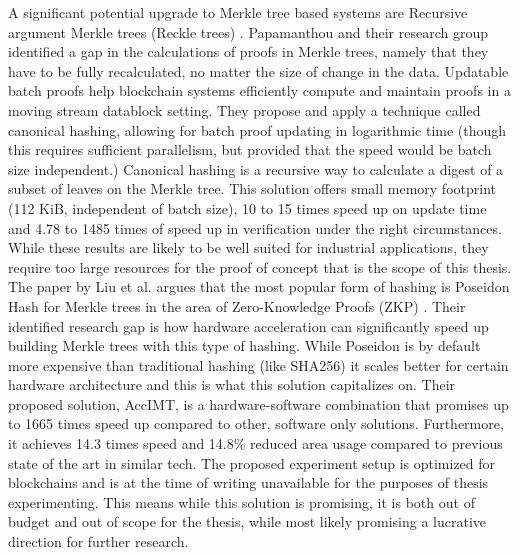 \documentclass[english, 12pt, a4paper, sci, utf8, a-2b, online]{aaltothesis}
\theoremstyle{change}
\theoremstyle{theoremstyle}
\begin{document}
A significant potential upgrade to Merkle tree based systems are Recursive argument Merkle trees (Reckle trees) \cite{papamanthou2024reckle}. Papamanthou and their research group identified a gap in the calculations of proofs in Merkle trees, namely that they have to be fully recalculated, no matter the size of change in the data. Updatable batch proofs help blockchain systems efficiently compute and maintain proofs in a moving stream datablock setting. They propose and apply a technique called canonical hashing, allowing for batch proof updating in logarithmic time (though this requires sufficient parallelism, but provided that the speed would be batch size independent.) Canonical hashing is a recursive way to calculate a digest of a subset of leaves on the Merkle tree. This solution offers small memory footprint (112 KiB, independent of batch size), 10 to 15 times speed up on update time and 4.78 to 1485 times of speed up in verification under the right circumstances. While these results are likely to be well suited for industrial applications, they require too large resources for the proof of concept that is the scope of this thesis.\\
The paper by Liu et al. argues that the most popular form of hashing is Poseidon Hash for Merkle trees in the area of Zero-Knowledge Proofs (ZKP) \cite{liu2025acclmt}. Their identified research gap is how hardware acceleration can significantly speed up building Merkle trees with this type of hashing. While Poseidon is by default more expensive than traditional hashing (like SHA256) it scales better for certain hardware architecture and this is what this solution capitalizes on. Their proposed solution, AccIMT,  is a hardware-software combination that promises up to 1665 times speed up compared to other, software only solutions. Furthermore, it achieves 14.3 times speed and 14.8\% reduced area usage compared to previous state of the art in similar tech. The proposed experiment setup is optimized for blockchains and is at the time of writing unavailable for the purposes of thesis experimenting. This means while this solution is promising, it is both out of budget and out of scope for the thesis, while most likely promising a lucrative direction for further research.\\
\end{document}
